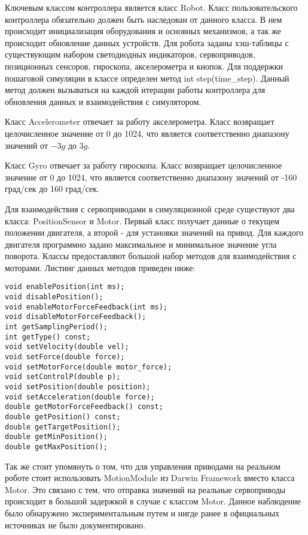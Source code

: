 Ключевым классом контроллера является класс Robot. Класс пользовательского контроллера обязательно должен быть наследован от данного класса. В нем происходит инициализация оборудования и основных механизмов, а так же происходит обновление данных устройств. Для робота заданы хэш-таблицы с существующим набором светодиодных индикаторов, сервоприводов, позиционных сенсоров, гироскопа, акселерометра и кнопок. Для поддержки пошаговой симуляции в классе определен метод int step(time\_step). Данный метод должен вызываться на каждой итерации работы контроллера для обновления данных и взаимодействия с симулятором.

Класс Accelerometer отвечает за работу акселерометра. Класс возвращает целочисленное значение от 0 до 1024, что является соответственно диапазону значений от $-3g$ до $3g$.

Класс Gyro отвечает за работу гироскопа. Класс возвращает целочисленное значение от 0 до 1024, что является соответственно диапазону значений от -160 град/сек до 160 град/сек.

Для взаимодействия с сервоприводами в симуляционной среде существуют два класса: PositionSensor и Motor. Первый класс получает данные о текущем положении двигателя, а второй - для установки значений на привод. Для каждого двигателя программно задано максимальное и минимальное значение угла поворота. Классы предоставляют большой набор методов для взаимодействия с моторами. Листинг данных методов приведен ниже:

\lstset{language=C++}
\begin{lstlisting}
void enablePosition(int ms);
void disablePosition();
void enableMotorForceFeedback(int ms);
void disableMotorForceFeedback();
int getSamplingPeriod();
int getType() const;
void setVelocity(double vel);
void setForce(double force);
void setMotorForce(double motor_force);
void setControlP(double p);
void setPosition(double position);
void setAcceleration(double force);
double getMotorForceFeedback() const;
double getPosition() const;
double getTargetPosition();
double getMinPosition();
double getMaxPosition();
\end{lstlisting}

Так же стоит упомянуть о том, что для управления приводами на реальном роботе стоит использовать MotionModule из Darwin Framework вместо класса Motor. Это связано с тем, что отправка значений на реальные сервоприводы происходит в большой задержкой в случае с классом Motor. Данное наблюдение было обнаружено экспериментальным путем и нигде ранее в официальных источниках не было документировано.

